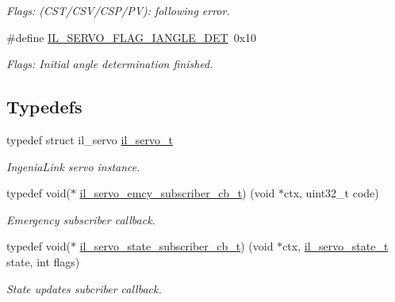 \begin{DoxyCompactItemize}
\begin{DoxyCompactList}\small\item\em Flags\+: (C\+S\+T/\+C\+S\+V/\+C\+S\+P/\+PV)\+: following error. \end{DoxyCompactList}\item 
\#define \hyperlink{group__IL__SERVO_gab8b5ab2cb8696d4781296b15ed4e0b67}{I\+L\+\_\+\+S\+E\+R\+V\+O\+\_\+\+F\+L\+A\+G\+\_\+\+I\+A\+N\+G\+L\+E\+\_\+\+D\+ET}~0x10
\begin{DoxyCompactList}\small\item\em Flags\+: Initial angle determination finished. \end{DoxyCompactList}\end{DoxyCompactItemize}
\subsection*{Typedefs}
\begin{DoxyCompactItemize}
\item 
typedef struct il\+\_\+servo \hyperlink{group__IL__SERVO_ga3369ddfcc33492fe3a28f96cf455b13e}{il\+\_\+servo\+\_\+t}
\begin{DoxyCompactList}\small\item\em Ingenia\+Link servo instance. \end{DoxyCompactList}\item 
typedef void($\ast$ \hyperlink{group__IL__SERVO_gad86cbd352b4ca4f73aa5bddece082a11}{il\+\_\+servo\+\_\+emcy\+\_\+subscriber\+\_\+cb\+\_\+t}) (void $\ast$ctx, uint32\+\_\+t code)
\begin{DoxyCompactList}\small\item\em Emergency subscriber callback. \end{DoxyCompactList}\item 
typedef void($\ast$ \hyperlink{group__IL__SERVO_ga60c0557ef5bc4c9e1b3bd32ea8d82861}{il\+\_\+servo\+\_\+state\+\_\+subscriber\+\_\+cb\+\_\+t}) (void $\ast$ctx, \hyperlink{group__IL__SERVO_ga34dfa4c089ba4ee833652ac6c40acd0d}{il\+\_\+servo\+\_\+state\+\_\+t} state, int flags)
\begin{DoxyCompactList}\small\item\em State updates subcriber callback. \end{DoxyCompactList}\end{DoxyCompactItemize}
